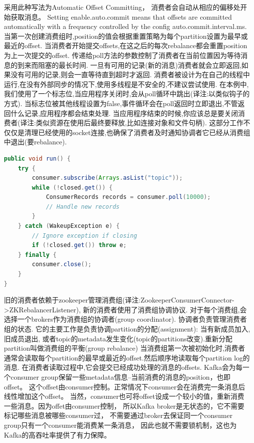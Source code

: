 \documentclass{book}
\newcounter{coderemarks}   %
\newcounter{codevar}     %
\newcommand{\circlemark}[1]{%
\tikz\node[text=white,font=\sffamily\bfseries,inner sep=0.2mm,draw,circle,fill=black]{#1};}
\newcommand{\showremarks}{%
\begin{list}{\circlemark{\arabic{codevar}}} %
{} %
\whiledo{\value{codevar} < \value{coderemarks}}{ %
\item \expandafter\csname codebox\the\value{codevar}\endcsname %
\stepcounter{codevar}} %
\end{list} %
\setcounter{coderemarks}{1}%
\setcounter{codevar}{1}%
}
\begin{document}
\showremarks

采用此种写法为Automatic Offset Committing，
消费者会自动从相应的偏移处开始获取消息。
Setting enable.auto.commit means that offsets are committed automatically 
with a frequency controlled by the config auto.commit.interval.ms.
当第一次创建消费组时,position的值会根据重置策略为每个partition设置为最早或最近的offset.
当消费者开始提交offsets,在这之后的每次rebalance都会重置position为上一次提交的offset.
传递给poll方法的参数控制了消费者在当前位置因为等待消息的到来而阻塞的最长时间.
一旦有可用的记录(新的消息)消费者就会立即返回,如果没有可用的记录,则会一直等待直到超时才返回.
消费者被设计为在自己的线程中运行,在没有外部同步的情况下,使用多线程是不安全的,不建议尝试使用.
在本例中,我们使用了一个标志位,当应用程序关闭时,会从poll循环中跳出(译注:以类似钩子的方式).
当标志位被其他线程设置为false,事件循环会在poll返回时立即退出,不管返回什么记录,应用程序都会结束处理.
当应用程序结束的时候,你应该总是要关闭消费者(译注:类似资源在使用后最终要释放,比如连接对象和文件句柄).
这部分工作不仅仅是清理已经使用的socket连接,也确保了消费者及时通知协调者它已经从消费组中退出(要rebalance).

\begin{lstlisting}[language=Java]
public void run() {
	try {
		consumer.subscribe(Arrays.asList("topic"));
		while (!closed.get()) {
			ConsumerRecords records = consumer.poll(10000);
			// Handle new records
		}
	} catch (WakeupException e) {
		// Ignore exception if closing
		if (!closed.get()) throw e;
	} finally {
		consumer.close();
	}
}
\end{lstlisting}

旧的消费者依赖于zookeeper管理消费组(译注:ZookeeperConsumerConnector->ZKRebalancerListener),
新的消费者使用了消费组协调协议. 对于每个消费组,会选择一个brokers作为消费组的协调者(group coordinator).
协调者负责管理消费者组的状态. 它的主要工作是负责协调partition的分配(assignment): 当有新成员加入,旧成员退出,
或者topic的metadata发生变化(topic的partitions改变).重新分配partition叫做消费组的平衡(group rebalance)
当消费组第一次被初始化时,消费者通常会读取每个partition的最早或最近的offset.然后顺序地读取每个partition log的消息.
在消费者读取过程中,它会提交已经成功处理的消息的offsets. 
Kafka会为每一个consumer group保留一些metadata信息–当前消费的消息的position，也即offset。
这个offset由consumer控制。正常情况下consumer会在消费完一条消息后线性增加这个offset。
当然，consumer也可将offset设成一个较小的值，重新消费一些消息。因为offet由consumer控制，
所以Kafka broker是无状态的，它不需要标记哪些消息被哪些consumer过，
不需要通过broker去保证同一个consumer group只有一个consumer能消费某一条消息，
因此也就不需要锁机制，这也为Kafka的高吞吐率提供了有力保障。 
\end{document}
